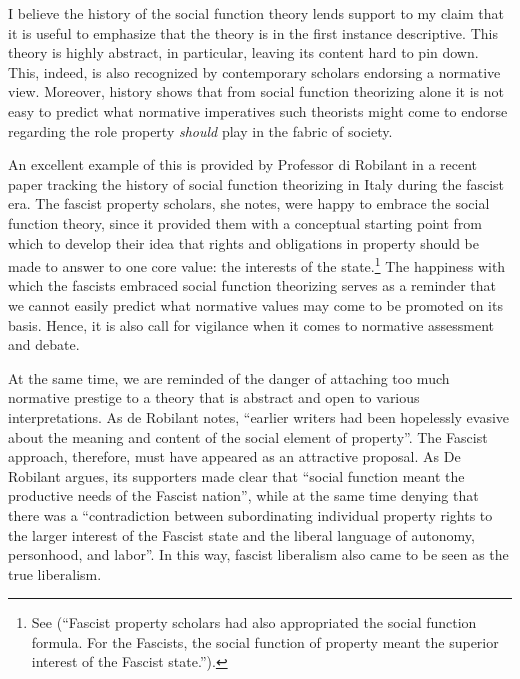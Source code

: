 I believe the history of the social function theory lends support to my claim that it is useful to emphasize that the theory is in the first instance descriptive. This theory is highly abstract, in particular, leaving its content hard to pin down. This, indeed, is also recognized by contemporary scholars endorsing a normative view. Moreover, history shows that from social function theorizing alone it is not easy to predict what normative imperatives such theorists might come to endorse regarding the role property {\it should} play in the fabric of society. 

An excellent example of this is provided by Professor di Robilant in a recent paper tracking the history of social function theorizing in Italy during the fascist era. The fascist property scholars, she notes, were happy to embrace the social function theory, since it provided them with a conceptual starting point from which to develop their idea that rights and obligations in property should be made to answer to one core value: the interests of the state.\footnote{See \cite[908-909]{robilant13} (``Fascist property scholars had also appropriated the social function formula. For the Fascists, the social function of property meant the superior interest of the Fascist state.'').} The happiness with which the fascists embraced social function theorizing serves as a reminder that we cannot easily predict what normative values may come to be promoted on its basis. Hence, it is also call for vigilance when it comes to normative assessment and debate. 

At the same time, we are reminded of the danger of attaching too much normative prestige to a theory that is abstract and open to various interpretations. As de Robilant notes, ``earlier writers had been hopelessly evasive about the meaning and content of the social element of property''. The Fascist approach, therefore, must have appeared as an attractive proposal. As De Robilant argues, its supporters made clear that ``social function meant the productive needs of the Fascist nation'', while at the same time denying that there was a ``contradiction between subordinating individual property rights to the larger interest of the Fascist state and the liberal language of autonomy, personhood, and labor''. In this way, fascist liberalism also came to be seen as the true liberalism.

